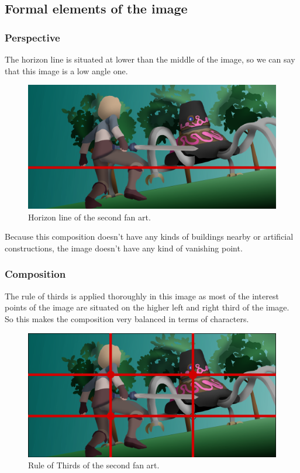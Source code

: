 \documentclass{cup-pan}
\begin{document}
\newpage
    \subsection{Formal elements of the image}
        
        \subsubsection{Perspective}

            The horizon line is situated at lower than the middle of the image, so we can say that this image is a low angle one.\\
            \begin{figure}[H]
                \includegraphics[width=\textwidth]{Imagenes/Fanart2/Analysis/horizonte.png}
                \caption{Horizon line of the second fan art.}
            \end{figure}

            Because this composition doesn't have any kinds of buildings nearby or artificial constructions, the image doesn't have any kind of vanishing point.\\

        \subsubsection{Composition}

            The rule of thirds is applied thoroughly in this image as most of the interest points of the image are situated on the higher left and right third of the image. So this makes the composition very balanced in terms of characters. 
            \begin{figure}[H]
                \includegraphics[width=\textwidth]{Imagenes/Fanart2/Analysis/Analysis.png}
                \caption{Rule of Thirds of the second fan art.}
            \end{figure}
\end{document}
